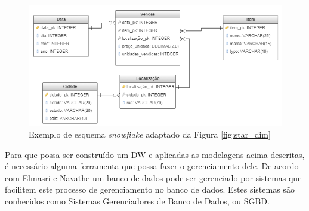 \begin{figure}[htpb]
	\centering
		\includegraphics[width=13cm]{img/snow}
	\caption{Exemplo de esquema \textit{snowflake} adaptado da Figura \ref{fig:star_dim}}
	\label{fig:snow}
\end{figure}

Para que possa ser construído um DW e aplicadas as modelagens acima descritas, 
é necessário alguma ferramenta que possa fazer o gerenciamento dele. 
De acordo com Elmasri e Navathe \cite{navathe2011banco} um banco de dados pode ser gerenciado por sistemas que 
facilitem este processo de gerenciamento no banco de dados. Estes sistemas são conhecidos como Sistemas Gerenciadores de Banco de Dados, ou SGBD.